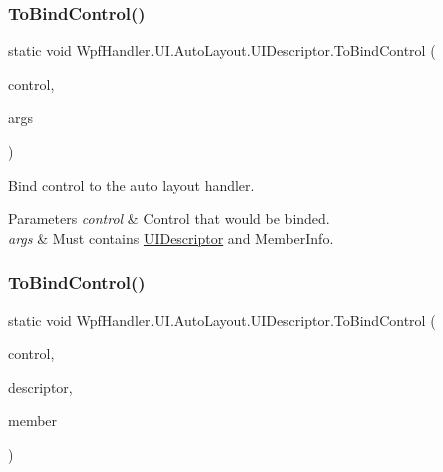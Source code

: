 \subsubsection{\texorpdfstring{To\+Bind\+Control()}{ToBindControl()}\hspace{0.1cm}{\footnotesize\ttfamily [1/2]}}
{\footnotesize\ttfamily static void Wpf\+Handler.\+U\+I.\+Auto\+Layout.\+U\+I\+Descriptor.\+To\+Bind\+Control (\begin{DoxyParamCaption}\item[{\mbox{\hyperlink{interface_wpf_handler_1_1_u_i_1_1_auto_layout_1_1_i_g_u_i_field}{I\+G\+U\+I\+Field}}}]{control,  }\item[{params object \mbox{[}$\,$\mbox{]}}]{args }\end{DoxyParamCaption})\hspace{0.3cm}{\ttfamily [static]}}



Bind control to the auto layout handler. 


\begin{DoxyParams}{Parameters}
{\em control} & Control that would be binded.\\
\hline
{\em args} & Must contains \mbox{\hyperlink{class_wpf_handler_1_1_u_i_1_1_auto_layout_1_1_u_i_descriptor}{U\+I\+Descriptor}} and Member\+Info.\\
\hline
\end{DoxyParams}
\mbox{\label{class_wpf_handler_1_1_u_i_1_1_auto_layout_1_1_u_i_descriptor_a763e1f50836b07edf0a3e6579454c335}} 
\subsubsection{\texorpdfstring{To\+Bind\+Control()}{ToBindControl()}\hspace{0.1cm}{\footnotesize\ttfamily [2/2]}}
{\footnotesize\ttfamily static void Wpf\+Handler.\+U\+I.\+Auto\+Layout.\+U\+I\+Descriptor.\+To\+Bind\+Control (\begin{DoxyParamCaption}\item[{\mbox{\hyperlink{interface_wpf_handler_1_1_u_i_1_1_auto_layout_1_1_i_g_u_i_field}{I\+G\+U\+I\+Field}}}]{control,  }\item[{\mbox{\hyperlink{class_wpf_handler_1_1_u_i_1_1_auto_layout_1_1_u_i_descriptor}{U\+I\+Descriptor}}}]{descriptor,  }\item[{Member\+Info}]{member }\end{DoxyParamCaption})\hspace{0.3cm}{\ttfamily [static]}}



